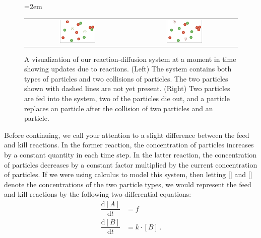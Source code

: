 \begin{figure}[h]
\centering
\mySfFamily
\tabcolsep=2em
\begin{tabular}{c c}
\includegraphics[width=0.35\textwidth]{../images/reaction-diffusion_three_reactions_before} & \includegraphics[width=0.35\textwidth]{../images/reaction-diffusion_three_reactions_after}\\
\end{tabular}
\caption{A visualization of our reaction-diffusion system at a moment in time showing updates due to reactions. (Left) The system contains both types of particles and two collisions of particles. The two  particles shown with dashed lines are not yet present.  (Right) Two  particles are fed into the system, two of the  particles die out, and a  particle replaces an  particle after the collision of two  particles and an  particle.}
\label{fig:three_reactions}
\end{figure}

Before continuing, we call your attention to a slight difference between the feed and kill reactions. In the former reaction, the concentration of  particles increases by a constant quantity in each time step. In the latter reaction, the concentration of  particles decreases by a constant factor multiplied by the current concentration of  particles. If we were using calculus to model this system, then letting [] and [] denote the concentrations of the two particle types, we would represent the feed and kill reactions by the following two differential equations:
\begin{align*}
\dfrac{\mathrm{d}[A]}{\mathrm{d}t} & = f\\[1ex]
\dfrac{\mathrm{d}[B]}{\mathrm{d}t} & = k \cdot [B]\,.
\end{align*}

